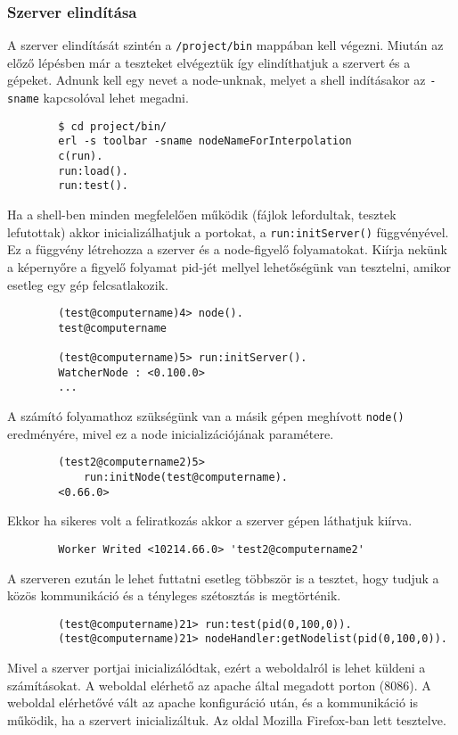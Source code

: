 \subsubsection{Szerver elindítása}
	A szerver elindítását szintén a \texttt{/project/bin} mappában kell végezni. Miután az előző lépésben már a teszteket elvégeztük így elindíthatjuk a szervert és a gépeket.
	Adnunk kell egy nevet a node-unknak, melyet a shell indításakor az \texttt{-sname} kapcsolóval lehet megadni.
	\begin{verbatim}
		$ cd project/bin/
		erl -s toolbar -sname nodeNameForInterpolation
		c(run).
		run:load().
		run:test().
	\end{verbatim}
	Ha a shell-ben minden megfelelően működik (fájlok lefordultak, tesztek lefutottak) akkor inicializálhatjuk a portokat, a \texttt{run:initServer()} függvényével. Ez a függvény létrehozza a szerver és a node-figyelő folyamatokat. Kiírja nekünk a képernyőre a figyelő folyamat pid-jét mellyel lehetőségünk van tesztelni, amikor esetleg egy gép felcsatlakozik. 
	\begin{verbatim}
		(test@computername)4> node().
		test@computername

		(test@computername)5> run:initServer().
		WatcherNode : <0.100.0>
		...
	\end{verbatim}
	A számító folyamathoz szükségünk van a másik gépen meghívott \texttt{node()} eredményére, mivel ez a node inicializációjának paramétere. 
	\begin{verbatim}
		(test2@computername2)5> 
		    run:initNode(test@computername).
		<0.66.0>
	\end{verbatim}
	Ekkor ha sikeres volt a feliratkozás akkor a szerver gépen láthatjuk kiírva.
	\begin{verbatim}
		Worker Writed <10214.66.0> 'test2@computername2'
	\end{verbatim}
	A szerveren ezután le lehet futtatni esetleg többször is a tesztet, hogy tudjuk a közös kommunikáció és a tényleges szétosztás is megtörténik.
	\begin{verbatim}
		(test@computername)21> run:test(pid(0,100,0)).
		(test@computername)21> nodeHandler:getNodelist(pid(0,100,0)).
	\end{verbatim}
	Mivel a szerver portjai inicializálódtak, ezért a weboldalról is lehet küldeni a számításokat. 
	A weboldal elérhető az apache által megadott porton (8086). A weboldal elérhetővé vált az apache konfiguráció után, és a kommunikáció is működik, ha a szervert inicializáltuk. Az oldal Mozilla Firefox-ban lett tesztelve.
